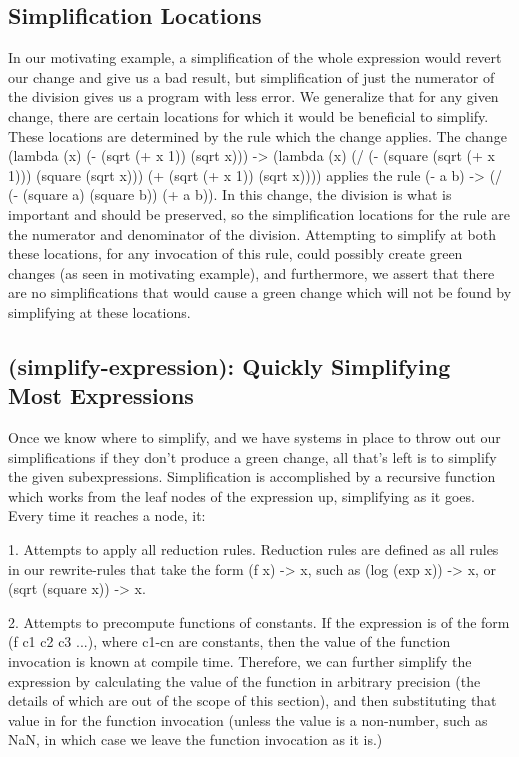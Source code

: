 \documentclass{article}
\begin{document}
\subsection{Simplification Locations}

In our motivating example, 
a simplification of the whole expression 
would revert our change 
and give us a bad result, 
but simplification of just the numerator 
of the division gives us a program with less error. 
We generalize that for any given change, 
there are certain locations 
for which it would be beneficial to simplify. 
These locations are determined 
by the rule which the change applies. 
The change 
(lambda (x) (- (sqrt (+ x 1)) (sqrt x))) -> 
(lambda (x) (/ (- (square (sqrt (+ x 1))) (square (sqrt x))) (+ (sqrt (+ x 1)) (sqrt x)))) 
applies the rule 
(- a b) -> 
(/ (- (square a) (square b)) (+ a b)). 
In this change, 
the division is what is important 
and should be preserved, 
so the simplification locations 
for the rule are the numerator 
and denominator of the division. 
Attempting to simplify at both these locations, 
for any invocation of this rule, 
could possibly create green changes 
(as seen in motivating example), 
and furthermore, 
we assert that there are no simplifications 
that would cause a green change 
which will not be found 
by simplifying at these locations.

\subsection{(simplify-expression): Quickly Simplifying Most Expressions}

Once we know where to simplify, 
and we have systems in place 
to throw out our simplifications 
if they don't produce a green change, 
all that's left is to simplify the given subexpressions. 
Simplification is accomplished 
by a recursive function 
which works from the leaf nodes 
of the expression up, 
simplifying as it goes. 
Every time it reaches a node, it:

1. Attempts to apply all reduction rules. 
Reduction rules are defined as all rules 
in our rewrite-rules 
that take the form (f x) -> x, 
such as (log (exp x)) -> x, 
or (sqrt (square x)) -> x.

2. Attempts to precompute functions of constants. 
If the expression 
is of the form (f c1 c2 c3 ...), 
where c1-cn are constants, 
then the value of the function invocation 
is known at compile time. 
Therefore, we can further simplify the expression 
by calculating the value of the function 
in arbitrary precision 
(the details of which are out of the scope of this section), 
and then substituting that value 
in for the function invocation 
(unless the value is a non-number, 
such as NaN, 
in which case we leave the function invocation 
as it is.)
\end{document}
